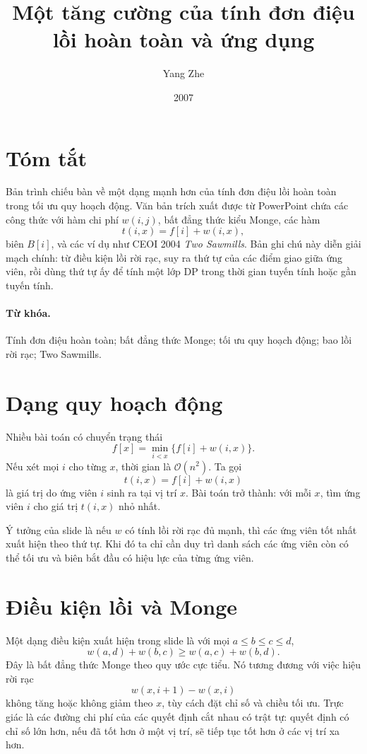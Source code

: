 \documentclass[11pt]{article}
\title{Một tăng cường của tính đơn điệu lồi hoàn toàn và ứng dụng}
\author{Yang Zhe}
\date{2007}
\newcommand{\Oh}{\mathcal{O}}
\begin{document}
\maketitle


\section*{Tóm tắt}

Bản trình chiếu bàn về một dạng mạnh hơn của tính đơn điệu lồi hoàn toàn
trong tối ưu quy hoạch động. Văn bản trích xuất được từ PowerPoint chứa các
công thức với hàm chi phí \(w(i,j)\), bất đẳng thức kiểu Monge, các hàm
\[
  t(i,x)=f[i]+w(i,x),
\]
biên \(B[i]\), và các ví dụ như CEOI 2004 \textit{Two Sawmills}. Bản ghi chú
này diễn giải mạch chính: từ điều kiện lồi rời rạc, suy ra thứ tự của các
điểm giao giữa ứng viên, rồi dùng thứ tự ấy để tính một lớp DP trong thời
gian tuyến tính hoặc gần tuyến tính.

\paragraph{Từ khóa.}
Tính đơn điệu hoàn toàn; bất đẳng thức Monge; tối ưu quy hoạch động; bao lồi
rời rạc; Two Sawmills.

\section{Dạng quy hoạch động}

Nhiều bài toán có chuyển trạng thái
\[
  f[x]=\min_{i<x}\{f[i]+w(i,x)\}.
\]
Nếu xét mọi \(i\) cho từng \(x\), thời gian là \(\Oh(n^2)\). Ta gọi
\[
  t(i,x)=f[i]+w(i,x)
\]
là giá trị do ứng viên \(i\) sinh ra tại vị trí \(x\). Bài toán trở thành:
với mỗi \(x\), tìm ứng viên \(i\) cho giá trị \(t(i,x)\) nhỏ nhất.

Ý tưởng của slide là nếu \(w\) có tính lồi rời rạc đủ mạnh, thì các ứng viên
tốt nhất xuất hiện theo thứ tự. Khi đó ta chỉ cần duy trì danh sách các ứng
viên còn có thể tối ưu và biên bắt đầu có hiệu lực của từng ứng viên.

\section{Điều kiện lồi và Monge}

Một dạng điều kiện xuất hiện trong slide là với mọi \(a\le b\le c\le d\),
\[
  w(a,d)+w(b,c)\ge w(a,c)+w(b,d).
\]
Đây là bất đẳng thức Monge theo quy ước cực tiểu. Nó tương đương với việc
hiệu rời rạc
\[
  w(x,i+1)-w(x,i)
\]
không tăng hoặc không giảm theo \(x\), tùy cách đặt chỉ số và chiều tối ưu.
Trực giác là các đường chi phí của các quyết định cắt nhau có trật tự: quyết
định có chỉ số lớn hơn, nếu đã tốt hơn ở một vị trí, sẽ tiếp tục tốt hơn ở
các vị trí xa hơn.
\end{document}
